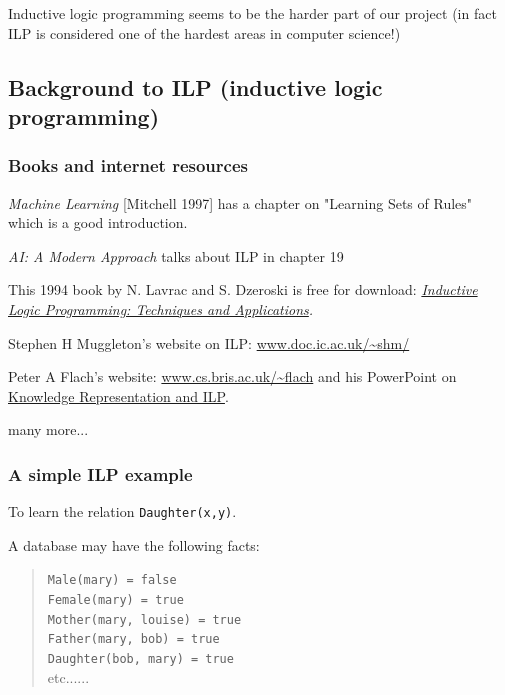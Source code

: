 Inductive logic programming seems to be the harder part of our project (in fact ILP is considered one of the hardest areas in computer science!)

\subsection{Background to ILP (inductive logic programming)}

\subsubsection{Books and internet resources}
\begin{compactenum}
	\item \emph{Machine Learning} [Mitchell 1997] \emph{}has a chapter on "Learning Sets of Rules" which is a good introduction.
	\item \emph{AI: A Modern Approach} talks about ILP in chapter 19
	\item {\normalsize This 1994 book by N. Lavrac and S. Dzeroski is free for download: \textit{\href{http://www-ai.ijs.si/SasoDzeroski/ILPBook/}{Inductive Logic Programming: Techniques and Applications}.}}
	\item Stephen H Muggleton's website on ILP: \href{http://www.doc.ic.ac.uk/~shm/}{www.doc.ic.ac.uk/\textasciitilde shm/}
	\item Peter A Flach's website: \href{http://www.cs.bris.ac.uk/~flach/}{www.cs.bris.ac.uk/\textasciitilde flach} and his PowerPoint on \href{http://macflach.cs.bris.ac.uk/~flach/presentations/CL2000HTML/CL2000.ppt}{Knowledge Representation and ILP}.
	\item many more...
\end{compactenum}

\subsubsection{A simple ILP example}

To learn the relation \texttt{Daughter(x,y)}.

A database may have the following facts:
\begin{quote}

\texttt{Male(mary) = false
\\
    Female(mary) = true
\\
    Mother(mary, louise) = true
\\
    Father(mary, bob) = true
\\
    Daughter(bob, mary) = true
\\}etc......
\end{quote}

